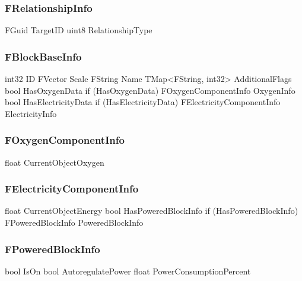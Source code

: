 \subsubsection{FRelationshipInfo}
\begin{code}
FGuid                                       TargetID
uint8                                       RelationshipType
\end{code}


\subsubsection{FBlockBaseInfo}
\begin{code}
int32                                       ID
FVector                                     Scale
FString                                     Name
TMap<FString, int32>                        AdditionalFlags
bool                                        HasOxygenData
if (HasOxygenData)
    FOxygenComponentInfo                    OxygenInfo
bool                                        HasElectricityData
if (HasElectricityData)
    FElectricityComponentInfo               ElectricityInfo
\end{code}





\subsubsection{FOxygenComponentInfo}
\begin{code}
float                                       CurrentObjectOxygen
\end{code}


\subsubsection{FElectricityComponentInfo}
\begin{code}
float                                       CurrentObjectEnergy
bool                                        HasPoweredBlockInfo
if (HasPoweredBlockInfo)
    FPoweredBlockInfo                       PoweredBlockInfo
\end{code}

\subsubsection{FPoweredBlockInfo}
\begin{code}
bool                                        IsOn
bool                                        AutoregulatePower
float                                       PowerConsumptionPercent
\end{code}



